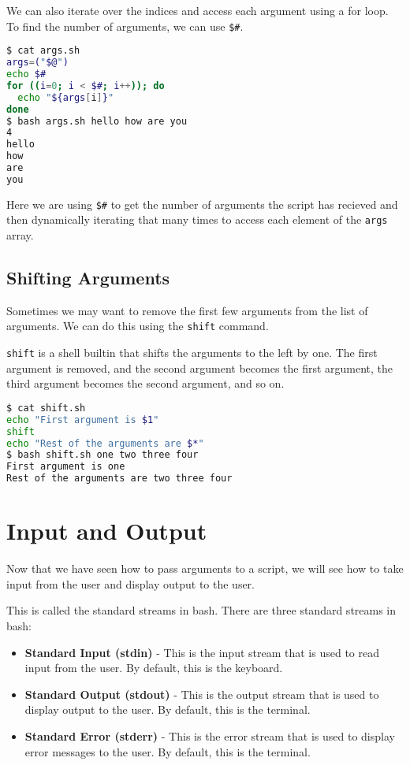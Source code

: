 We can also iterate over the indices and access each argument using a for loop. To find the number of arguments, we can use \lstinline|$#|.

\begin{lstlisting}[language=bash]
$ cat args.sh
args=("$@")
echo $#
for ((i=0; i < $#; i++)); do
  echo "${args[i]}"
done
$ bash args.sh hello how are you
4
hello
how
are
you
\end{lstlisting}

Here we are using \lstinline|$#| to get the number of arguments the script has recieved and then dynamically iterating that many times to access each element of the \lstinline|args| array.

\subsection{Shifting Arguments}

Sometimes we may want to remove the first few arguments from the list of arguments. We can do this using the \lstinline{shift} command.

\lstinline|shift| is a shell builtin that shifts the arguments to the left by one. The first argument is removed, and the second argument becomes the first argument, the third argument becomes the second argument, and so on.

\begin{lstlisting}[language=bash]
$ cat shift.sh
echo "First argument is $1"
shift
echo "Rest of the arguments are $*"
$ bash shift.sh one two three four
First argument is one
Rest of the arguments are two three four
\end{lstlisting}

\section{Input and Output}

Now that we have seen how to pass arguments to a script, we will see how to take input from the user and display output to the user.

This is called the standard streams in bash. There are three standard streams in bash:

\begin{itemize}
    \item \textbf{Standard Input (stdin)} - This is the input stream that is used to read input from the user. By default, this is the keyboard.
    \item \textbf{Standard Output (stdout)} - This is the output stream that is used to display output to the user. By default, this is the terminal.
    \item \textbf{Standard Error (stderr)} - This is the error stream that is used to display error messages to the user. By default, this is the terminal.
\end{itemize}

